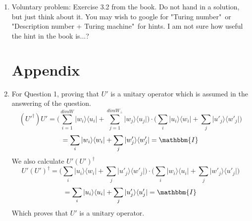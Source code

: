 \documentclass[12pt]{article}
\newcommand{\ket}[1]{\vert{#1}\rangle}
\newcommand{\bra}[1]{\langle{#1}\vert}
\begin{document}
\begin{enumerate}
\item Voluntary problem: Exercise 3.2 from the book. Do not hand in a solution, but just think about it. You may wish to google for "Turing number"\ or "Description number + Turing machine"\ for hints. I am not sure how useful the hint in the book is...?
\section{Appendix}
\item For Question 1, proving that $U'$ is a unitary operator which is assumed in the answering of the question. 
$$ (U'^\dagger)U' = \Big( \sum_{i=1}^{dim W} \ket{w_i} \bra{u_i} + \sum_{j=1}^{dim W_\perp}\ket{w_j}\bra{u_j}\Big)\cdot\Big( \sum_i \ket{u_i} \bra{w_i} + \sum_j\ket{u'_j}\bra{w'_j}\Big)$$
$$ = \sum_i \ket{w_i} \bra{w_i} + \sum_j \ket{w'_j}\bra{w'_j} = \mathbbm{I} $$
We also calculate $U'(U')^\dagger$ 
$$ U'(U')^\dagger = \Big(\sum_i \ket{u_i}\bra{w_i} + \sum_j \ket{u'_j}\bra{w'_j}\Big) \cdot \Big(\sum_i \ket{w_i}\bra{u_i} + \sum_j \ket{w'_j}\bra{u'_j}\Big) $$
$$ = \sum_i \ket{u_i}\bra{u_i} + \sum_j \ket{u'_j}\bra{u'_j} = \mathbbm{I} $$
Which proves that $U'$ is a unitary operator. 

\end{enumerate}
\end{document}
